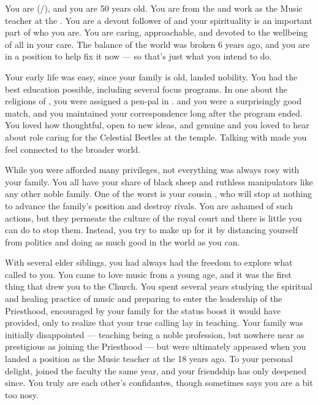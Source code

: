 \documentclass[char]{GL2020}
\begin{document}
\name{\cMusic{}}

You are \cMusic{\full} (\cMusic{\they}/\cMusic{\them}), and you are 50 years old. You are from the \pFarm{} and work as the Music teacher at the \pSchool{}. You are a devout follower of \cFarmGod{} and your spirituality is an important part of who you are. You are caring, approachable, and devoted to the wellbeing of all in your care. The balance of the world was broken 6 years ago, and you are in a position to help fix it now — so that's just what you intend to do.

Your early life was easy, since your family is old, landed nobility. You had the best education possible, including several focus programs. In one about the religions of \pEarth{}, you were assigned a pen-pal in \pTech{}. \cBeetle{\full} and you were a surprisingly good match, and you maintained your correspondence long after the program ended. You loved how thoughtful, open to new ideas, and genuine \cBeetle{\theywere} and you loved to hear about \cBeetle{\their} role caring for the Celestial Beetles at the temple. Talking with \cBeetle{\them} made you feel connected to the broader world.   

While you were afforded many privileges, not everything was always rosy with your family. You all have your share of black sheep and ruthless manipulators like any other noble family. One of the worst is your cousin \cEvilNemesis{\full}, who will stop at nothing to advance the family's position and destroy rivals. You are ashamed of such actions, but they permeate the culture of the royal court and there is little you can do to stop them. Instead, you try to make up for it by distancing yourself from \pFarm{} politics and doing as much good in the world as you can. 

With several elder siblings, you had always had the freedom to explore what called to you. You came to love music from a young age, and it was the first thing that drew you to the Church. You spent several years studying the spiritual and healing practice of music and preparing to enter the leadership of the Priesthood, encouraged by your family for the status boost it would have provided, only to realize that your true calling lay in teaching. Your family was initially disappointed — teaching being a noble profession, but nowhere near as prestigious as joining the Priesthood — but were ultimately appeased when you landed a position as the Music teacher at the \pSchool{} 18 years ago. To your personal delight, \cBeetle{} joined the faculty the same year, and your friendship has only deepened since. You truly are each other’s confidantes, though sometimes \cBeetle{}says you are a bit too nosy.  
\end{document}
